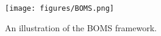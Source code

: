 \begin{figure}[!ht]
    \centering
    \texttt{[image: figures/BOMS.png]}
    \caption{An illustration of the BOMS framework.}
    \label{fig:BOMS}
\end{figure}

\begin{comment}
\noindent{\textbf{Contributions:}} We summarize our main contributions as follows.
\begin{itemize}[leftmargin=*]
\item We identify the critical problem of model selection in offline MBRL and pinpoint the inherent issues of the existing validation and OPE methods.
\item We introduce the active model selection problem and propose BOMS, which is a general-purpose active model selection framework for improving the performance of any off-the-shelf offline MBRL method with only a small budget of online interaction. Moreover, we propose a theoretically-grounded kernel function that enables computationally-efficient BOMS.
\item Through extensive experiments and an ablation study on multiple Offline RL benchmark tasks, we demonstrate that BOMS could significantly enhance the performance of offline MBRL algorithms with a small amount of online interaction.
\end{itemize}
    
\end{comment}